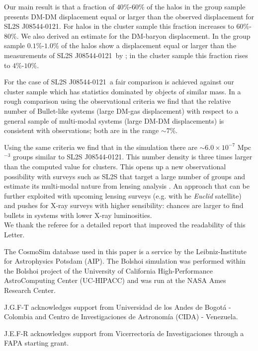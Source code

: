\documentclass{emulateapj}
\newcommand{\bullg}{SL2S J08544-0121}
\begin{document}
Our main result is that a fraction of $40\%$-$60\%$ of the halos
in the group sample presents DM-DM displacement equal or larger than the
observed displacement for \bullg. For halos in the cluster sample this
fraction increases to $60\%$-$80\%$. We also derived an
estimate for the DM-baryon displacement. In the group sample
$0.1\%$-$1.0\%$ of the halos show a displacement equal or larger than
the  measurements of \bullg\ by \cite{Gastaldello}; in the cluster
sample this fraction rises to $4\%$-$10\%$. 

For the case of \bullg\ a fair comparison is achieved against our cluster
sample which has statistics dominated by objects of similar mass. In
a rough comparison using the observational criteria \citep{Foex2013,
  Gastaldello} we find that the relative number of Bullet-like systems
(large DM-gas displacement) with respect to a general sample of
multi-modal systems (large DM-DM displacements) is consistent with
observations; both are in the range $\sim 7\%$. 

Using the same criteria we find that in the simulation there are
$\sim 6.0\times 10^{-7}$ Mpc$^{-3}$ groups similar to \bullg. This
number density is three times larger than the computed value for
clusters. This opens up a new observational possibility with surveys
such as SL2S that target a large number of groups and estimate its
multi-modal nature from lensing analysis \citep{Foex2013}. An approach
that can be further exploited with upcoming lensing surveys (e.g. with
 he {\it Euclid} satellite) and pushes for X-ray surveys with higher
sensibility: chances are larger to find bullets in systems with lower
X-ray luminosities.\\




We thank the referee for a detailed report that improved the readability of
this Letter. 

The CosmoSim database used in this paper is a service by the
Leibniz-Institute for Astrophysics Potsdam (AIP). The  Bolshoi
simulation was performed within the Bolshoi project of the University
of California High-Performance AstroComputing Center (UC-HIPACC) and
was run at the NASA Ames Research Center. 

J.G.F-T acknowledges support from Universidad de los Andes de Bogot\'a
- Colombia and Centro de Investigaciones de Astronom\'ia (CIDA) -
Venezuela. 

J.E.F-R acknowledges support from Vicerrector\'ia de
Investigaciones through a FAPA starting grant.
\end{document}
